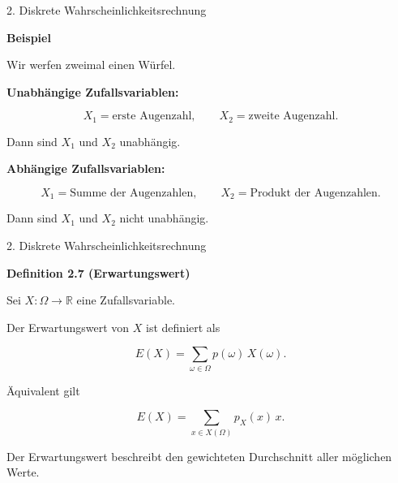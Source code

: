 \documentclass{beamer}
\begin{document}
\begin{frame}{2. Diskrete Wahrscheinlichkeitsrechnung}

\textbf{Beispiel}

\vspace{0.3cm}

Wir werfen zweimal einen Würfel.

\vspace{0.3cm}

\textbf{Unabhängige Zufallsvariablen:}

\[
X_1=\text{erste Augenzahl},
\qquad
X_2=\text{zweite Augenzahl}.
\]

Dann sind \(X_1\) und \(X_2\) unabhängig.

\vspace{0.4cm}

\textbf{Abhängige Zufallsvariablen:}

\[
X_1=\text{Summe der Augenzahlen},
\qquad
X_2=\text{Produkt der Augenzahlen}.
\]

Dann sind \(X_1\) und \(X_2\) nicht unabhängig.

\end{frame}

\begin{frame}{2. Diskrete Wahrscheinlichkeitsrechnung}

\textbf{Definition 2.7 (Erwartungswert)}

\vspace{0.3cm}

Sei \(X:\Omega\to\mathbb R\) eine Zufallsvariable.

Der Erwartungswert von \(X\) ist definiert als

\[
E(X)
=
\sum_{\omega\in\Omega}
p(\omega)\,X(\omega).
\]

\vspace{0.4cm}

Äquivalent gilt

\[
E(X)
=
\sum_{x\in X(\Omega)}
p_X(x)\,x.
\]

\vspace{0.4cm}

Der Erwartungswert beschreibt den gewichteten
Durchschnitt aller möglichen Werte.

\end{frame}
\end{document}
